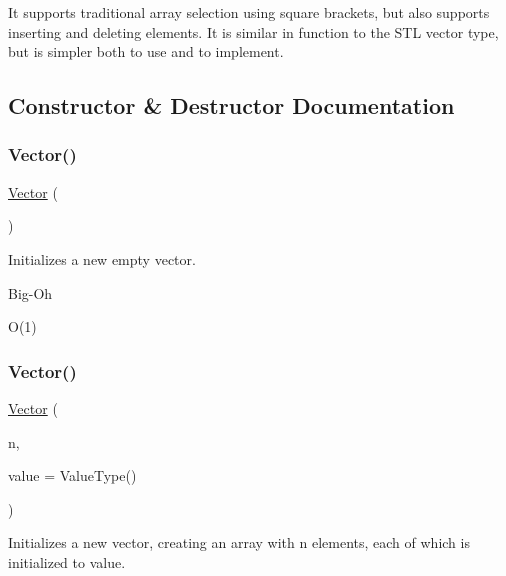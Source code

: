 It supports traditional array selection using square brackets, but also supports inserting and deleting elements. It is similar in function to the S\+TL {\ttfamily vector} type, but is simpler both to use and to implement. 

\subsection{Constructor \& Destructor Documentation}
\mbox{\label{classVector_a4df026156780bc0ca651c342b7d6daa4}} 
\subsubsection{\texorpdfstring{Vector()}{Vector()}\hspace{0.1cm}{\footnotesize\ttfamily [1/3]}}
{\footnotesize\ttfamily \mbox{\hyperlink{classVector}{Vector}} (\begin{DoxyParamCaption}{ }\end{DoxyParamCaption})}



Initializes a new empty vector. 

\begin{DoxyRefDesc}{Big-\/\+Oh}
\item[\mbox{\hyperlink{BigOh__BigOh000099}{Big-\/\+Oh}}]O(1) \end{DoxyRefDesc}
\mbox{\label{classVector_abf5f4a6c2e8f722dfaed5c07027a84ac}} 
\subsubsection{\texorpdfstring{Vector()}{Vector()}\hspace{0.1cm}{\footnotesize\ttfamily [2/3]}}
{\footnotesize\ttfamily \mbox{\hyperlink{classVector}{Vector}} (\begin{DoxyParamCaption}\item[{int}]{n,  }\item[{Value\+Type}]{value = {\ttfamily ValueType()} }\end{DoxyParamCaption})\hspace{0.3cm}{\ttfamily [explicit]}}



Initializes a new vector, creating an array with {\ttfamily n} elements, each of which is initialized to {\ttfamily value}. 


